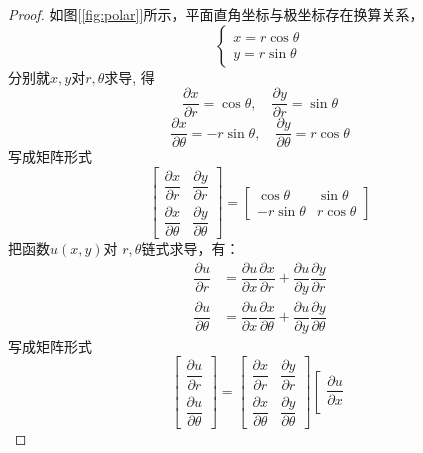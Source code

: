 \begin{proof}
    如图[\ref{fig:polar}]所示，平面直角坐标与极坐标存在换算关系，
	\begin{equation}\label{eq:polar1}
		\begin{cases}
		x= r\cos \theta  \\
		y= r\sin \theta 
		\end{cases} 
		\end{equation}
	分别就$x,y$对$r,\theta$求导, 得
	$$ \dfrac{\partial x}{\partial r} = \cos\theta , \quad \dfrac{\partial y}{\partial r} = \sin \theta $$
	$$ \dfrac{\partial x}{\partial \theta} = -r\sin \theta , \quad \dfrac{\partial y}{\partial \theta}  = r\cos \theta $$
	写成矩阵形式
	\begin{equation}\label{eq:laplace3}
		\left[\begin{array}{ccc}
		\dfrac{\partial x}{\partial r} & \dfrac{\partial y}{\partial r} \\ 
		\dfrac{\partial x}{\partial \theta} & \dfrac{\partial y}{\partial \theta}  
	\end{array}\right]
	= \left[\begin{array}{ccc}
		\cos\theta  & \sin \theta \\ 
		-r\sin \theta  & r\cos \theta 
	\end{array}\right]
\end{equation}
	把函数$u(x,y)$对 $r, \theta $链式求导，有：
	$$\begin{aligned}
		\dfrac{\partial {u}}{\partial {r}}&=\dfrac{\partial {u}}{\partial x} \dfrac{\partial {x}}{\partial {r}}+\dfrac{\partial u}{\partial {y}} \dfrac{\partial {y}}{\partial {r}} \\ 
		\dfrac{\partial {u}}{\partial \theta}&=\dfrac{\partial {u}}{\partial x} \dfrac{\partial{x}}{\partial \theta}+\dfrac{\partial u}{\partial {y}} \dfrac{\partial {y}}{\partial \theta} 
	\end{aligned} $$
	写成矩阵形式 
	$$\left[\begin{array}{ccc}
		\dfrac{\partial u}{\partial r} \\ 
		\dfrac{\partial u}{\partial \theta} 
	\end{array}\right]
	=
	\left[\begin{array}{ccc}
		\dfrac{\partial x}{\partial r} & \dfrac{\partial y}{\partial r} \\ 
		\dfrac{\partial x}{\partial \theta} & \dfrac{\partial y}{\partial \theta}  
	\end{array}\right]
	\left[\begin{array}{ccc}
		\dfrac{\partial u}{\partial x} \\ 

\end{array}$$
\end{proof}
